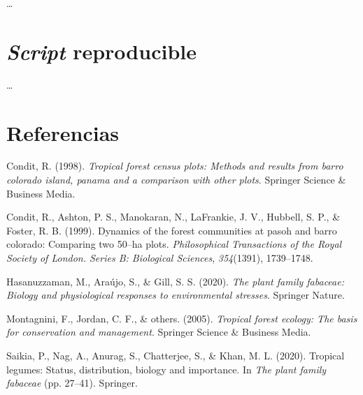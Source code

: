 \documentclass[11pt,]{article}
\begin{document}
\ldots

\section{\texorpdfstring{\emph{Script}
reproducible}{Script reproducible}}\label{script-reproducible}

\ldots

\section*{Referencias}\label{referencias}

\hypertarget{refs}{}
\hypertarget{ref-condit1998tropical}{}
Condit, R. (1998). \emph{Tropical forest census plots: Methods and
results from barro colorado island, panama and a comparison with other
plots}. Springer Science \& Business Media.

\hypertarget{ref-condit1999dynamics}{}
Condit, R., Ashton, P. S., Manokaran, N., LaFrankie, J. V., Hubbell, S.
P., \& Foster, R. B. (1999). Dynamics of the forest communities at pasoh
and barro colorado: Comparing two 50--ha plots. \emph{Philosophical
Transactions of the Royal Society of London. Series B: Biological
Sciences}, \emph{354}(1391), 1739--1748.

\hypertarget{ref-hasanuzzaman2020plant}{}
Hasanuzzaman, M., Araújo, S., \& Gill, S. S. (2020). \emph{The plant
family fabaceae: Biology and physiological responses to environmental
stresses}. Springer Nature.

\hypertarget{ref-montagnini2005tropical}{}
Montagnini, F., Jordan, C. F., \& others. (2005). \emph{Tropical forest
ecology: The basis for conservation and management}. Springer Science \&
Business Media.

\hypertarget{ref-saikia2020tropical}{}
Saikia, P., Nag, A., Anurag, S., Chatterjee, S., \& Khan, M. L. (2020).
Tropical legumes: Status, distribution, biology and importance. In
\emph{The plant family fabaceae} (pp. 27--41). Springer.




\newpage
\singlespacing 
\end{document}
